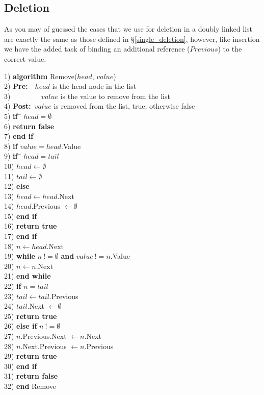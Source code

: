 \subsection{Deletion}
As you may of guessed the cases that we use for deletion in a doubly linked list are exactly the same as those defined in \S\ref{single_deletion}, however, like insertion we have the added task of binding an additional reference ($Previous$) to the correct value.

\newpage
\begin{tabbing}
1)  \textbf{alg}\= \textbf{orithm} Remove($head$, $value$) \\
2)  \> \textbf{Pre:}~~$head$ is the head node in the list \\
3)  \> ~~~~~~~~$value$ is the value to remove from the list \\
4)  \> \textbf{Post:}~$value$ is removed from the list, true; otherwise false \\
5)  \> \textbf{if}~\= $head = \emptyset$ \\
6)  \> \> \textbf{return false} \\
7)  \> \textbf{end if} \\
8)  \> \textbf{if} $value = head$.Value \\
9)  \> \> \textbf{if}~\= $head = tail$ \\
10) \> \> \> $head \leftarrow \emptyset$ \\
11) \> \> \> $tail \leftarrow \emptyset$ \\
12) \> \> \textbf{else} \\
13) \> \> \> $head \leftarrow head$.Next \\
14) \> \> \> $head$.Previous $\leftarrow \emptyset$ \\
15) \> \> \textbf{end if} \\
16) \> \> \textbf{return true} \\
17) \> \textbf{end if} \\
18) \> $n \leftarrow head$.Next \\
19) \> \textbf{while} $n~!= \emptyset$ \textbf{and} $value~!= n$.Value \\
20) \> \> $n \leftarrow n$.Next \\
21) \> \textbf{end while} \\
22) \> \textbf{if} $n = tail$ \\
23) \> \> $tail \leftarrow tail$.Previous \\
24) \> \> $tail$.Next $\leftarrow \emptyset$ \\
25) \> \> \textbf{return true} \\
26) \> \textbf{else if} $n~!= \emptyset$ \\
27) \> \> $n$.Previous.Next $\leftarrow n$.Next \\
28) \> \> $n$.Next.Previous $\leftarrow n$.Previous \\
29) \> \> \textbf{return true} \\
30) \> \textbf{end if} \\
31) \> \textbf{return false} \\
32) \textbf{end} Remove \\
\end{tabbing}

